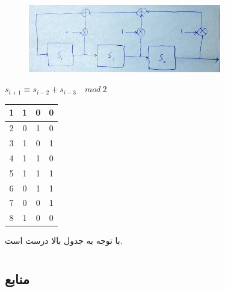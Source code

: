 \documentclass{article}
\begin{document}
\subsection{}
\begin{figure}[H]
    \centering
    \includegraphics[width=0.75\textwidth]{figures/3.jpg}
    \caption
	{}
    \label{fig:fig1}
\end{figure}

\begin{latin}
$
s_{i+1} \equiv s_{i-2} + s_{i-3} \quad mod\:2
$
\begin{longtable}[c]{c|c|c|c|}
\cline{2-4}
1 & 1 & 0 & 0 \\ \cline{2-4}
\endfirsthead
%
\endhead
%
2 & 0 & 1 & 0 \\ \cline{2-4} 
3 & 1 & 0 & 1 \\ \cline{2-4} 
4 & 1 & 1 & 0 \\ \cline{2-4} 
5 & 1 & 1 & 1 \\ \cline{2-4} 
6 & 0 & 1 & 1 \\ \cline{2-4} 
7 & 0 & 0 & 1 \\ \cline{2-4} 
8 & 1 & 0 & 0 \\ \cline{2-4} 
\end{longtable}
\end{latin}
با توجه به جدول بالا درست است.


\section{}%




\section{}%






\subsection*{منابع}
\end{document}
